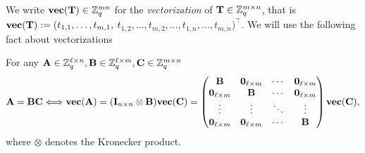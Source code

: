 We write ${\mathbf{vec}({\mathbf{T}})}\in\mathbb{Z}_q^{mn}$ for the \emph{vectorization} of $\mathbf{{T}}\in\mathbb{Z}_q^{m\times n}$, that is
$
{\mathbf{vec}({\mathbf{T}})}:= (t_{1,1},\ldots,t_{m,1},$ $t_{1,2},\ldots,t_{m,2},\ldots,t_{1,n},\ldots,t_{m,n})^\top
$. We will use the following fact about vectorizations
\begin{fact}
For any $\mathbf{{A}}\in\mathbb{Z}_q^{\ell\times n},\mathbf{{B}}\in\mathbb{Z}_q^{\ell\times m},\mathbf{{C}}\in\mathbb{Z}_q^{m\times n}$
$$
\mathbf{{A}}=\mathbf{{B}}\mathbf{{C}}
\Longleftrightarrow
{\mathbf{vec}({\mathbf{A}})} = (\mathbf{{I}}_{n\times n}\otimes\mathbf{{B}}){\mathbf{vec}({\mathbf{C}})} = 
\begin{pmatrix}
\mathbf{{B}}                & \mathbf{{0}}_{\ell\times m} & \cdots & \mathbf{{0}}_{\ell\times m}\\
\mathbf{{0}}_{\ell\times m} & \mathbf{{B}}                & \cdots & \mathbf{{0}}_{\ell\times m}\\
\vdots                  & \vdots                  & \ddots & \vdots                 \\
\mathbf{{0}}_{\ell\times m} & \mathbf{{0}}_{\ell\times m} & \cdots & \mathbf{{B}}
\end{pmatrix}
{\mathbf{vec}({\mathbf{C}})},
$$
where $\otimes$ denotes the Kronecker product.
\end{fact}



